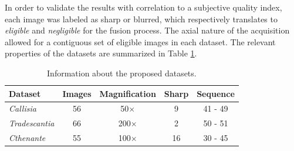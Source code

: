 In order to validate the results with correlation to a subjective quality index, each image was labeled as sharp or blurred, which respectively translates to \emph{eligible} and \emph{negligible} for the fusion process. The axial nature of the acquisition allowed for a contiguous set of eligible images in each dataset. The relevant properties of the datasets are summarized in Table \ref{tab:dataset_info}. 

\begin{table}[ht]
    \centering
    \caption{Information about the proposed datasets.}
    \label{tab:dataset_info}
    \begin{tabular}{lcccc}
        \toprule
        \textbf{Dataset} & \textbf{Images} & \textbf{Magnification} & \textbf{Sharp} & \textbf{Sequence}\\
        \midrule
        \textit{Callisia} & 56 & 50$\times$ & 9 & 41 - 49\\
        \textit{Tradescantia} & 66 & 200$\times$ & 2 & 50 - 51\\
        \textit{Cthenante} & 55 & 100$\times$ & 16 & 30 - 45\\
        \bottomrule
    \end{tabular}
    \centering
    \fautor
\end{table}